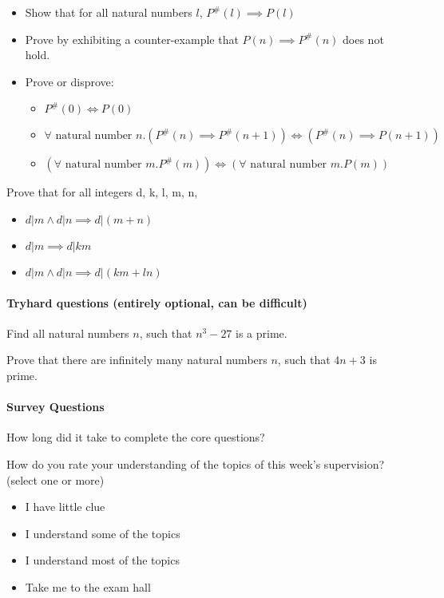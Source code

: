 \documentclass{exam}
\begin{document}
\begin{questions}
\begin{itemize}
\item Show that for all natural numbers $l$, $P^\#(l)\implies P(l)$
\item Prove by exhibiting a counter-example that $P(n)\implies P^\#(n)$ does not hold.
\item Prove or disprove:
\begin{itemize}
\item $P^\#(0) \iff P(0)$
\item $\forall \text{ natural number } n. (P^\#(n) \implies P^\#(n+1)) \iff (P^\#(n) \implies P(n+1)) $
\item $(\forall \text{ natural number } m.P^\#(m) ) \iff (\forall \text{ natural number } m.P(m) )$
\end{itemize}
\end{itemize}

\question Prove that for all integers d, k, l, m, n,
\begin{itemize}
\item $d | m \wedge d | n \implies d | (m + n)$
\item $ d | m \implies d | k m$
\item $ d | m \wedge d | n \implies d | (k m + l n)$
\end{itemize} 

\end{questions}

\paragraph{Tryhard questions (entirely optional, can be difficult)}
\begin{questions}
\question Find all natural numbers $n$, such that $n^3-27$ is a prime.

\question Prove that there are infinitely many natural numbers $n$, such that $4n+3$ is prime.
\end{questions}

\paragraph{Survey Questions}
\begin{questions}
\question How long did it take to complete the core questions?
 
\question How do you rate your understanding of the topics of this week's supervision? (select one or more)

\begin{itemize}
\item
I have little clue
\item 
I understand some of the topics
\item
I understand most of the topics
\item
Take me to the exam hall
\end{itemize}
\end{questions}
\end{document}
